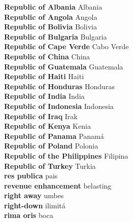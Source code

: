 \textbf{ Republic of Albania  } Albania \\
\textbf{ Republic of Angola  } Angola \\
\textbf{ Republic of Bolivia  } Bolivia \\
\textbf{ Republic of Bulgaria  } Bulgaria \\
\textbf{ Republic of Cape Verde  } Cabo Verde \\
\textbf{ Republic of China  } China \\
\textbf{ Republic of Guatemala  } Guatemala \\
\textbf{ Republic of Haiti  } Haiti \\
\textbf{ Republic of Honduras  } Honduras \\
\textbf{ Republic of India  } India \\
\textbf{ Republic of Indonesia  } Indonesia \\
\textbf{ Republic of Iraq  } Irak \\
\textbf{ Republic of Kenya  } Kenia \\
\textbf{ Republic of Panama  } Panamá \\
\textbf{ Republic of Poland  } Polonia \\
\textbf{ Republic of the Philippines  } Filipina \\
\textbf{ Republic of Turkey  } Turkia \\
\textbf{ res publica  } pais \\
\textbf{ revenue enhancement  } belasting \\
\textbf{ right away  } umbes \\
\textbf{ right-down  } ilimitá \\
\textbf{ rima oris  } boca \\
